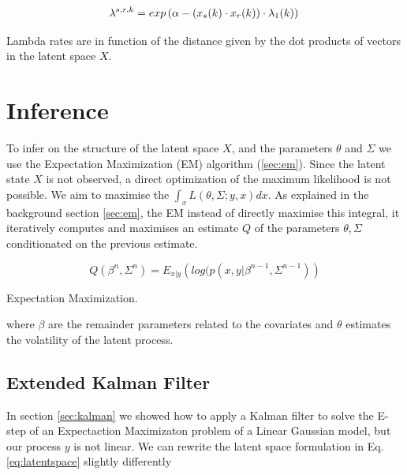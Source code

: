 \documentclass[mscthesis]{usiinfthesis}
\begin{document}
\begin{eqfloat}
\begin{equation}
\lambda^{s, r, k} = exp\left(\alpha-(x_s(k) \cdot x_r(k)) \cdot \lambda_1(k) \right) \\
\label{eq:ourmodel_lambda}
\end{equation}
\caption{Lambda rates are in function of the distance given by the dot products of vectors in the latent space $X$.}
\end{eqfloat}

\section{Inference}
To infer on the structure of the latent space $X$, and the parameters $\theta$  and $\Sigma$ we use the Expectation Maximization (EM) algorithm (\ref{sec:em}). Since the latent state $X$ is not observed, a direct optimization of the maximum likelihood is not possible. We aim to maximise the $\int_x L(\theta, \Sigma ; y, x) dx$. As explained in the background section \ref{sec:em}, the EM instead of directly maximise this integral, it iteratively computes and maximises an estimate $Q$ of the parameters $\theta, \Sigma$ conditionated on the previous estimate. 

\begin{eqfloat}
\begin{equation}
Q(\beta^{n}, \Sigma^{n}) = E_{x|y} \left( log(p(x, y | \beta^{n-1}, \Sigma^{n-1}) \right)
\end{equation}
\caption{Expectation Maximization.}
\label{eq:expectation_maximization}
\end{eqfloat}

where $\beta$ are the remainder parameters related to the covariates and $\theta$ estimates the volatility of the latent process.


\subsection{Extended Kalman Filter}

In section \ref{sec:kalman} we showed how to apply a Kalman filter to solve the E-step of an Expectaction Maximizaton problem of a Linear Gaussian model, but our process $y$ is not linear. We can rewrite the latent space formulation in Eq. \ref{eq:latentspace} slightly differently
\end{document}
